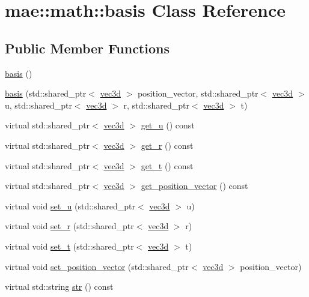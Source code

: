 \hypertarget{classmae_1_1math_1_1basis}{\section{mae\-:\-:math\-:\-:basis Class Reference}
\label{classmae_1_1math_1_1basis}
}
\subsection*{Public Member Functions}
\begin{DoxyCompactItemize}
\item 
\hyperlink{classmae_1_1math_1_1basis_a20b328000b2a05065b2b3fd3f01dc1db}{basis} ()
\item 
\hyperlink{classmae_1_1math_1_1basis_a03cc7a891aee20d97b35773f3e0201a5}{basis} (std\-::shared\-\_\-ptr$<$ \hyperlink{classmae_1_1math_1_1vec3d}{vec3d} $>$ position\-\_\-vector, std\-::shared\-\_\-ptr$<$ \hyperlink{classmae_1_1math_1_1vec3d}{vec3d} $>$ u, std\-::shared\-\_\-ptr$<$ \hyperlink{classmae_1_1math_1_1vec3d}{vec3d} $>$ r, std\-::shared\-\_\-ptr$<$ \hyperlink{classmae_1_1math_1_1vec3d}{vec3d} $>$ t)
\item 
virtual std\-::shared\-\_\-ptr$<$ \hyperlink{classmae_1_1math_1_1vec3d}{vec3d} $>$ \hyperlink{classmae_1_1math_1_1basis_a31db97f8289074bcc274dbf626f3f9b6}{get\-\_\-u} () const 
\item 
virtual std\-::shared\-\_\-ptr$<$ \hyperlink{classmae_1_1math_1_1vec3d}{vec3d} $>$ \hyperlink{classmae_1_1math_1_1basis_adeaf5ae18e066bd20ddcc4be8a844d80}{get\-\_\-r} () const 
\item 
virtual std\-::shared\-\_\-ptr$<$ \hyperlink{classmae_1_1math_1_1vec3d}{vec3d} $>$ \hyperlink{classmae_1_1math_1_1basis_a3c9af401b04f96c4d765a43c207c3916}{get\-\_\-t} () const 
\item 
virtual std\-::shared\-\_\-ptr$<$ \hyperlink{classmae_1_1math_1_1vec3d}{vec3d} $>$ \hyperlink{classmae_1_1math_1_1basis_a1343e0d24ce24d73d41d8ec316837b5f}{get\-\_\-position\-\_\-vector} () const 
\item 
virtual void \hyperlink{classmae_1_1math_1_1basis_a09ea870f8765b92d200c74893f554253}{set\-\_\-u} (std\-::shared\-\_\-ptr$<$ \hyperlink{classmae_1_1math_1_1vec3d}{vec3d} $>$ u)
\item 
virtual void \hyperlink{classmae_1_1math_1_1basis_a08992f887e7f7691f53fe31f4245deb9}{set\-\_\-r} (std\-::shared\-\_\-ptr$<$ \hyperlink{classmae_1_1math_1_1vec3d}{vec3d} $>$ r)
\item 
virtual void \hyperlink{classmae_1_1math_1_1basis_a0574f45a44b8fc1c38bf1ef603e621a9}{set\-\_\-t} (std\-::shared\-\_\-ptr$<$ \hyperlink{classmae_1_1math_1_1vec3d}{vec3d} $>$ t)
\item 
virtual void \hyperlink{classmae_1_1math_1_1basis_a89b97015efedce5e4c0b178ebae19e2f}{set\-\_\-position\-\_\-vector} (std\-::shared\-\_\-ptr$<$ \hyperlink{classmae_1_1math_1_1vec3d}{vec3d} $>$ position\-\_\-vector)
\item 
virtual std\-::string \hyperlink{classmae_1_1math_1_1basis_a070c4a1ad93988e38b1b47ef31bb6c7d}{str} () const 
\end{DoxyCompactItemize}
